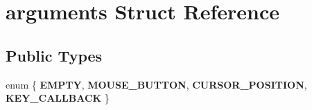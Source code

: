 \hypertarget{structarguments}{}\section{arguments Struct Reference}
\label{structarguments}
\subsection*{Public Types}
\begin{DoxyCompactItemize}
\item 
\hypertarget{structarguments_ab94edf98bcd6e3cbf6bac919112e2f8a}{}enum \{ {\bfseries E\+M\+P\+T\+Y}, 
{\bfseries M\+O\+U\+S\+E\+\_\+\+B\+U\+T\+T\+O\+N}, 
{\bfseries C\+U\+R\+S\+O\+R\+\_\+\+P\+O\+S\+I\+T\+I\+O\+N}, 
{\bfseries K\+E\+Y\+\_\+\+C\+A\+L\+L\+B\+A\+C\+K}
 \}\label{structarguments_ab94edf98bcd6e3cbf6bac919112e2f8a}

\end{DoxyCompactItemize}
